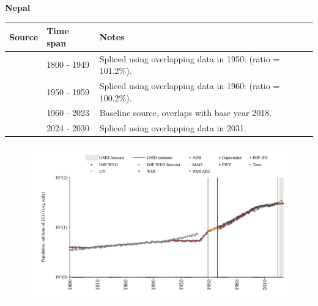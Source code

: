 \documentclass[12pt,a4paper,landscape]{article}
\begin{document}
\begin{adjustbox}{max totalsize={\paperwidth}{\paperheight},center}
\begin{minipage}[t][\textheight][t]{\textwidth}
\vspace*{0.5cm}
{}
\begin{center}
{\Large\bfseries Nepal}
\end{center}
\vspace{0.5cm}
\begin{table}[H]
\centering
\small
\begin{tabular}{|l|l|l|}
\hline
\textbf{Source} & \textbf{Time span} & \textbf{Notes} \\
\hline
\rowcolor{white}\cite{Gapminder}& 1800 - 1949 &Spliced using overlapping data in 1950: (ratio = 101.2\%).\\
\rowcolor{lightgray}\cite{IMF_IFS}& 1950 - 1959 &Spliced using overlapping data in 1960: (ratio = 100.2\%).\\
\rowcolor{white}\cite{WDI}& 1960 - 2023 &Baseline source, overlaps with base year 2018.\\
\rowcolor{lightgray}\cite{Gapminder}& 2024 - 2030 &Spliced using overlapping data in 2031.\\
\hline
\end{tabular}
\end{table}
\begin{figure}[H]
\centering
\includegraphics[width=\textwidth,height=0.6\textheight,keepaspectratio]{graphs/NPL_pop.pdf}
\end{figure}
\end{minipage}
\end{adjustbox}
\end{document}
